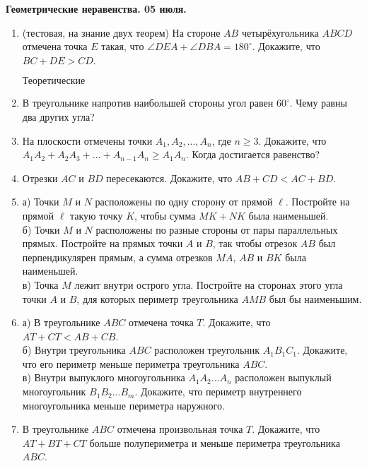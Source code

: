 \begin{center}
\Large
\textbf{Геометрические неравенства. 05 июля.}
\end{center}  
\large
\begin{enumerate}

\item (тестовая, на знание двух теорем) На стороне $AB$ четырёхугольника $ABCD$ отмечена точка $E$ такая, что $\angle DEA+\angle DBA = 180^{\circ}$. Докажите, что $BC+DE>CD$.

$\textit{Теоретические}$

\item В треугольнике напротив наибольшей стороны угол равен $60^{\circ}$. Чему равны два других угла?

\item На плоскости отмечены точки $A_{1}, A_{2},..., A_{n}$, где $n\geq 3$. Докажите, что $A_{1}A_{2}+A_{2}A_{3}+...+A_{n-1}A_{n}\geq A_{1}A_{n}$. Когда достигается равенство?

\item Отрезки $AC$ и $BD$ пересекаются. Докажите, что $AB+CD<AC+BD$.

\item а) Точки $M$ и $N$ расположены по одну сторону от прямой $\ell$. Постройте на прямой $\ell$ такую точку $K$, чтобы сумма $MK+NK$ была наименьшей. \\
б) Точки $M$ и $N$ расположены по разные стороны от пары параллельных прямых. Постройте на прямых точки $A$ и $B$, так чтобы отрезок $AB$ был перпендикулярен прямым, а сумма отрезков $MA$, $AB$ и $BK$ была наименьшей.\\
в) Точка $M$ лежит внутри острого угла. Постройте на сторонах этого угла точки $A$ и $B$, для которых периметр треугольника $AMB$ был бы наименьшим.

\item а) В треугольнике $ABC$ отмечена точка $T$. Докажите, что $AT+CT<AB+CB$.\\
б) Внутри треугольника $ABC$ расположен треугольник $A_{1}B_{1}C_{1}$. Докажите, что его периметр меньше периметра треугольника $ABC$.\\
в) Внутри выпуклого многоугольника $A_{1}A_{2}...A_{n}$ расположен выпуклый многоугольник $B_{1}B_{2}...B_{m}$. Докажите, что периметр внутреннего многоугольника меньше периметра наружного.

\item В треугольнике $ABC$ отмечена произвольная точка $T$. Докажите, что $AT+BT+CT$ больше полупериметра и меньше периметра треугольника $ABC$. 


\end{enumerate}
